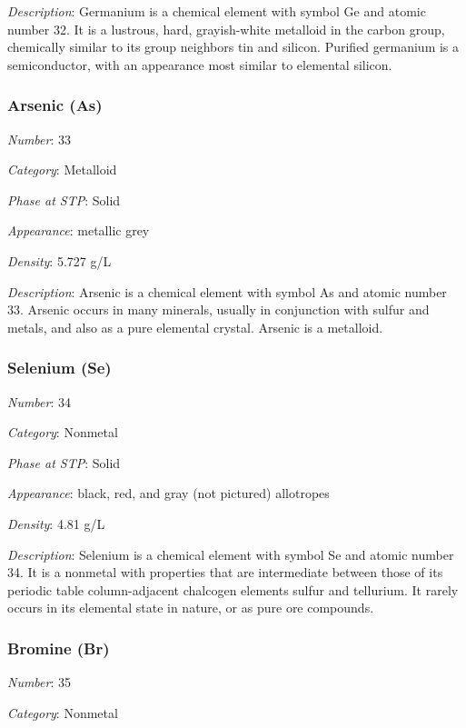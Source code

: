 \documentclass{article}
\begin{document}
\textit{Description}: Germanium is a chemical element with symbol Ge and atomic number 32. It is a lustrous, hard, grayish-white metalloid in the carbon group, chemically similar to its group neighbors tin and silicon. Purified germanium is a semiconductor, with an appearance most similar to elemental silicon.

\hypertarget{subsubsection::As}{}\subsubsection{Arsenic (As)}

\textit{Number}: 33

\textit{Category}: Metalloid

\textit{Phase at STP}: Solid

\textit{Appearance}: metallic grey

\textit{Density}: 5.727 g/L

\textit{Description}: Arsenic is a chemical element with symbol As and atomic number 33. Arsenic occurs in many minerals, usually in conjunction with sulfur and metals, and also as a pure elemental crystal. Arsenic is a metalloid.

\hypertarget{subsubsection::Se}{}\subsubsection{Selenium (Se)}

\textit{Number}: 34

\textit{Category}: Nonmetal

\textit{Phase at STP}: Solid

\textit{Appearance}: black, red, and gray (not pictured) allotropes

\textit{Density}: 4.81 g/L

\textit{Description}: Selenium is a chemical element with symbol Se and atomic number 34. It is a nonmetal with properties that are intermediate between those of its periodic table column-adjacent chalcogen elements sulfur and tellurium. It rarely occurs in its elemental state in nature, or as pure ore compounds.

\hypertarget{subsubsection::Br}{}\subsubsection{Bromine (Br)}

\textit{Number}: 35

\textit{Category}: Nonmetal
\end{document}
